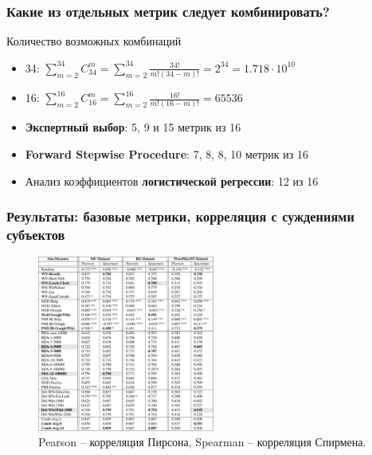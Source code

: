 \begin{frame}
\frametitle{Какие из отдельных метрик следует комбинировать?}

\begin{block}{Количество возможных комбинаций}
 \begin{itemize}
 \item \alert{34}: $\sum_{m=2}^{34}C_{34}^m=\sum_{m=2}^{34}\frac{34!}{m!(34-m)!}= 2^{34}= 1.718 \cdot 10^{10}$
 \item \alert{16}: $\sum_{m=2}^{16}C_{16}^m=\sum_{m=2}^{16}\frac{16!}{m!(16-m)!}=65536$
 \end{itemize}
  \end{block}

\begin{itemize}

\item \textbf{Экспертный выбор}: \alert{5}, \alert{9} и \alert{15} метрик из 16
\item \textbf{Forward Stepwise Procedure}: \alert{7}, \alert{8}, \alert{8}, \alert{10} метрик из 16
\item Анализ коэффициентов \textbf{логистической регрессии}: \alert{12} из 16


\end{itemize}
\end{frame}
  


\begin{frame}
\frametitle{Результаты: базовые метрики, корреляция с суждениями субъектов}

\begin{figure}
\centering
\includegraphics[width=0.52\textwidth]{figures/hj}
\caption{\footnotesize Pearson -- корреляция Пирсона, Spearman -- корреляция Спирмена.}
\end{figure}
    
\end{frame}





